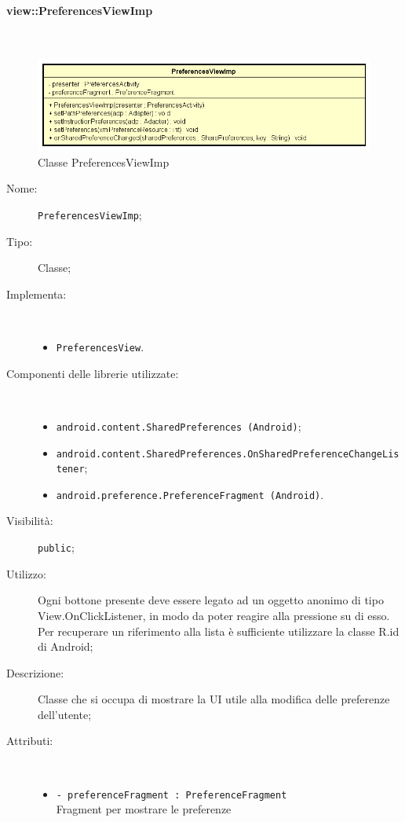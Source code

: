 \documentclass[../DefinizioneDiProdotto.tex]{subfiles}
\begin{document}
\paragraph{view::PreferencesViewImp}
\
\begin{figure}[H]
	\centering
	\includegraphics[width=\maxwidth]{img/PreferencesViewImp.png}
	\caption{Classe PreferencesViewImp}\label{fig:view::PreferencesViewImp} 
\end{figure}
\begin{description}
	\item[Nome:] \texttt{PreferencesViewImp};
	\item[Tipo:] Classe;
	\item[Implementa:] \
	\begin{itemize}
		\item \texttt{PreferencesView}.
		
	\end{itemize}
	\item[Componenti delle librerie utilizzate:] \
	\begin{itemize}
		\item \texttt{android.content.SharedPreferences (Android)};
		
		\item \texttt{android.content.SharedPreferences.OnSharedPreferenceChangeListener};
		
		\item \texttt{android.preference.PreferenceFragment (Android)}.
		
	\end{itemize}
	\item[Visibilità:] \texttt{public};
	\item[Utilizzo:] Ogni bottone presente deve essere legato ad un oggetto anonimo di tipo View.OnClickListener, in modo da poter reagire alla pressione su di esso. Per recuperare un riferimento alla lista è sufficiente utilizzare la classe R.id di Android;
	\item[Descrizione:] Classe che si occupa di mostrare la UI utile alla modifica delle preferenze dell'utente;
	\item[Attributi:] \
	\begin{itemize}
		\item \texttt{- preferenceFragment : PreferenceFragment}\\
		Fragment per mostrare le preferenze
		

\end{itemize}
\end{description}
\end{document}
